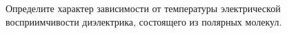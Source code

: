 \documentclass[__main__.tex]{subfiles}
\begin{document}
Определите характер зависимости от температуры электрической восприимчивости диэлектрика, состоящего из полярных молекул.\\ 

\end{document}
